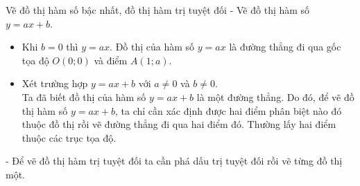 \begin{dang}{Vẽ đồ thị hàm số bậc nhất, đồ thị hàm trị tuyệt đối}
	- Vẽ đồ thị hàm số $y=ax+b$.
	\begin{itemize}
		\item Khi $b=0$ thì $y=ax$. Đồ thị của hàm số $y=ax$ là đường thẳng đi qua gốc tọa độ $O(0;0)$ và điểm $A(1;a)$.
		\item Xét trường hợp $y=ax+b$ với $a\ne 0$ và $b\ne 0.$\\
		Ta đã biết đồ thị của hàm số $y=ax+b$ là một đường thẳng. Do đó, để vẽ đồ thị hàm số $y=ax+b$, ta chỉ cần xác định được hai điểm phân biệt nào đó thuộc đồ thị rồi vẽ đường thẳng đi qua hai điểm đó. Thường lấy hai điểm thuộc các trục tọa độ.
	\end{itemize}
	- Để vẽ đồ thị hàm trị tuyệt đối ta cần phá dấu trị tuyệt đối rồi vẽ từng đồ thị một.
\end{dang}

